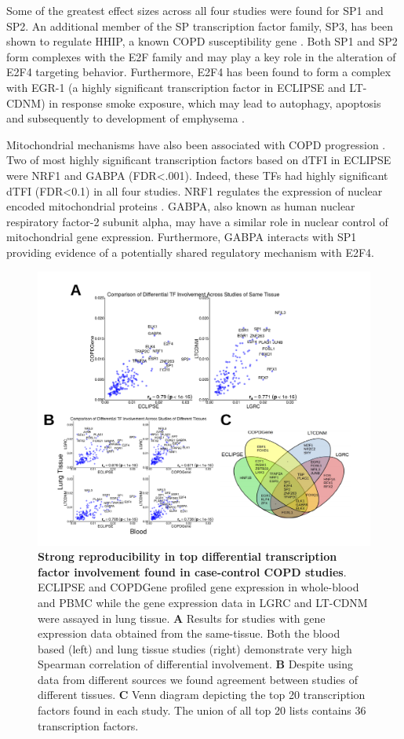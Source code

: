 Some of the greatest effect sizes across all four studies were found for SP1 and SP2.  An additional member of the SP transcription factor family, SP3, has been shown to regulate HHIP, a known COPD susceptibility gene \cite{zhou2012identification}. Both SP1 and SP2 form complexes with the E2F family \cite{rotheneder1999transcription, karlseder1996interaction} and may play a key role in the alteration of E2F4 targeting behavior. Furthermore, E2F4 has been found to form a complex with EGR-1 (a highly significant transcription factor in ECLIPSE and LT-CDNM) in response smoke exposure, which may lead to autophagy, apoptosis and subsequently to development of emphysema \cite{chen2008egr}. 

Mitochondrial mechanisms have also been associated with COPD progression \cite{cloonan2016mitochondrial}. Two of most highly significant transcription factors based on dTFI in ECLIPSE  were NRF1 and GABPA (FDR<.001). Indeed, these TFs had highly significant dTFI (FDR<0.1) in all four studies. NRF1 regulates the expression of nuclear encoded mitochondrial proteins \cite{gopalakrishnan1995structure}. GABPA, also known as human nuclear respiratory factor-2 subunit alpha, may have a similar role in nuclear control of mitochondrial gene expression. Furthermore, GABPA interacts with SP1 \cite{galvagni2001sp1} providing evidence of a potentially shared regulatory mechanism with E2F4.

\begin{figure}
\includegraphics[width=.8\linewidth]{figures/figure3}
\caption[Reproducibility in top differential transcription factor involvement]{\textbf{Strong reproducibility in top differential transcription factor involvement found in case-control COPD studies}. ECLIPSE and COPDGene
profiled gene expression in whole-blood and PBMC while the gene expression data in LGRC and LT-CDNM were assayed in lung tissue. \textbf{A} Results for studies with gene expression data obtained from the same-tissue. Both the blood based (left) and lung tissue studies (right) demonstrate very high Spearman correlation of differential involvement. \textbf{B} Despite using data from different sources we found agreement between studies of different tissues. \textbf{C} Venn diagram depicting the top 20 transcription factors found in each study. The union of all top 20 lists contains 36  transcription factors.}
\label{fig:compare}
\end{figure}

